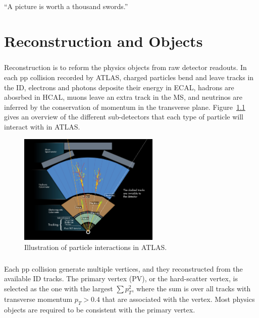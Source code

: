 \begin{savequote}[75mm]
“A picture is worth a thousand swords.”
\end{savequote}

\chapter{Reconstruction and Objects}

\paragraph{}
Reconstruction is to reform the physics objects from raw detector readouts. 
In each pp collision recorded by ATLAS, charged particles bend and leave tracks in the ID, electrons and photons deposite their energy in ECAL, hadrons are abosrbed in HCAL, muons leave an extra track in the MS, and neutrinos are inferred by the conservation of momentum in the transverse plane. 
Figure~\ref{fig:reco_overview} gives an overview of the different sub-detectors that each type of particle will interact with in ATLAS.

\begin{figure}[h!]
  \centering
  \captionsetup{justification=centering}
  \includegraphics[width=0.6\textwidth]{figures/detector/ATLAS_particle}
   \caption{Illustration of particle interactions in ATLAS.}
  \label{fig:reco_overview}
\end{figure}

\paragraph{}
Each pp collision generate multiple vertices, and they reconstructed from the available ID tracks. 
The primary vertex (PV), or the hard-scatter vertex, is selected as the one with the largest $\sum p_T^2$, where the sum is over all tracks with transverse momentum $p_T > 0.4$ \GeV that are associated with the vertex. 
Most physics objects are required to be consistent with the primary vertex.

